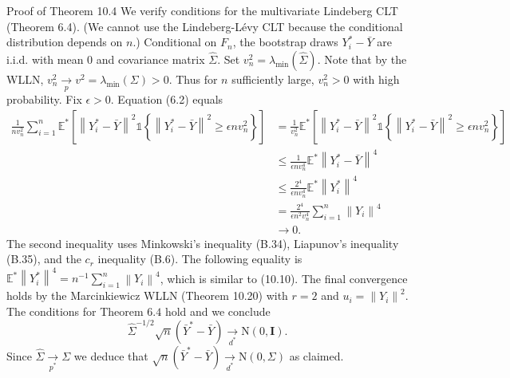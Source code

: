 \documentclass[10pt]{article}
\begin{document}
Proof of Theorem 10.4 We verify conditions for the multivariate Lindeberg CLT (Theorem 6.4). (We cannot use the Lindeberg-Lévy CLT because the conditional distribution depends on $n$.) Conditional on $F_{n}$, the bootstrap draws $Y_{i}^{*}-\bar{Y}$ are i.i.d. with mean 0 and covariance matrix $\widehat{\Sigma}$. Set $v_{n}^{2}=\lambda_{\min }(\widehat{\Sigma})$. Note that by the WLLN, $v_{n}^{2} \underset{p}{\rightarrow} v^{2}=\lambda_{\min }(\Sigma)>0$. Thus for $n$ sufficiently large, $v_{n}^{2}>0$ with high probability. Fix $\epsilon>0$. Equation (6.2) equals
$$
\begin{aligned}
\frac{1}{n v_{n}^{2}} \sum_{i=1}^{n} \mathbb{E}^{*}\left[\left\|Y_{i}^{*}-\bar{Y}\right\|^{2} \mathbb{1}\left\{\left\|Y_{i}^{*}-\bar{Y}\right\|^{2} \geq \epsilon n v_{n}^{2}\right\}\right] &=\frac{1}{v_{n}^{2}} \mathbb{E}^{*}\left[\left\|Y_{i}^{*}-\bar{Y}\right\|^{2} \mathbb{1}\left\{\left\|Y_{i}^{*}-\bar{Y}\right\|^{2} \geq \epsilon n v_{n}^{2}\right\}\right] \\
& \leq \frac{1}{\epsilon n v_{n}^{4}} \mathbb{E}^{*}\left\|Y_{i}^{*}-\bar{Y}\right\|^{4} \\
& \leq \frac{2^{4}}{\epsilon n v_{n}^{4}} \mathbb{E}^{*}\left\|Y_{i}^{*}\right\|^{4} \\
&=\frac{2^{4}}{\epsilon n^{2} v_{n}^{4}} \sum_{i=1}^{n}\left\|Y_{i}\right\|^{4} \\
& \longrightarrow 0 .
\end{aligned}
$$
The second inequality uses Minkowski's inequality (B.34), Liapunov's inequality (B.35), and the $c_{r}$ inequality (B.6). The following equality is $\mathbb{E}^{*}\left\|Y_{i}^{*}\right\|^{4}=n^{-1} \sum_{i=1}^{n}\left\|Y_{i}\right\|^{4}$, which is similar to (10.10). The final convergence holds by the Marcinkiewicz WLLN (Theorem 10.20) with $r=2$ and $u_{i}=\left\|Y_{i}\right\|^{2}$. The conditions for Theorem $6.4$ hold and we conclude
$$
\widehat{\Sigma}^{-1 / 2} \sqrt{n}\left(\bar{Y}^{*}-\bar{Y}\right) \underset{d^{*}}{\longrightarrow} \mathrm{N}(0, \boldsymbol{I}) .
$$
Since $\widehat{\Sigma} \underset{p^{*}}{\longrightarrow} \Sigma$ we deduce that $\sqrt{n}\left(\bar{Y}^{*}-\bar{Y}\right) \underset{d^{*}}{\longrightarrow} \mathrm{N}(0, \Sigma)$ as claimed.
\end{document}
